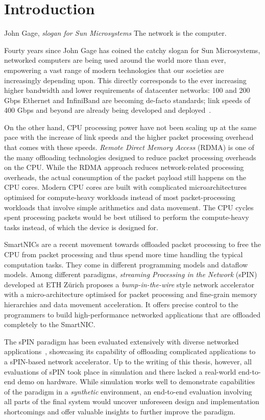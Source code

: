 \chapter{Introduction}
\begin{chapquote}{John Gage, \textit{slogan for Sun Microsystems}}
The network is the computer.
\end{chapquote}

Fourty years since John Gage has coined the catchy slogan for Sun Microsystems, networked computers are being used around the world more than ever, empowering a vast range of modern technologies that our societies are increasingly depending upon.  This directly corresponds to the ever increasing higher bandwidth and lower requirements of datacenter networks: 100 and 200 Gbps Ethernet and InfiniBand are becoming de-facto standards; link speeds of 400 Gbps and beyond are already being developed and deployed~\cite{miller_pursuit_nodate}.

On the other hand, CPU processing power have not been scaling up at the same pace with the increase of link speeds and the higher packet processing overhead that comes with these speeds.  \emph{Remote Direct Memory Access} (RDMA) is one of the many offloading technologies designed to reduce packet processing overheads on the CPU.  While the RDMA approach reduces network-related processing overheads, the actual consumption of the packet payload still happens on the CPU cores.  Modern CPU cores are built with complicated microarchitectures optimised for compute-heavy workloads instead of most packet-processing workloads that involve simple arithmetics and data movement.  The CPU cycles spent processing packets would be best utilised to perform the compute-heavy tasks instead, of which the device is designed for.

SmartNICs are a recent movement towards offloaded packet processing to free the CPU from packet processing and thus spend more time handling the typical computation tasks.  They come in different programming models and dataflow models.  Among different paradigms, \emph{streaming Processing in the Network} (sPIN)~\cite{hoefler_spin_2017} developed at ETH Z\"urich proposes a \emph{bump-in-the-wire} style network accelerator with a micro-architecture optimised for packet processing and fine-grain memory hierarchies and data movement acceleration.  It offers precise control to the programmers to build high-performance networked applications that are offloaded completely to the SmartNIC.

The sPIN paradigm has been evaluated extensively with diverse networked applications~\cite{di_girolamo_network-accelerated_2019, cao_accelerating_2022, di_girolamo_building_2022}, showcasing its capability of offloading complicated applications to a sPIN-based network accelerator.  Up to the writing of this thesis, however, all evaluations of sPIN took place in simulation and there lacked a real-world end-to-end demo on hardware.  While simulation works well to demonstrate capabilities of the paradigm in a \emph{synthetic} environment, an end-to-end evaluation involving all parts of the final system would uncover unforeseen design and implementation shortcomings and offer valuable insights to further improve the paradigm.

